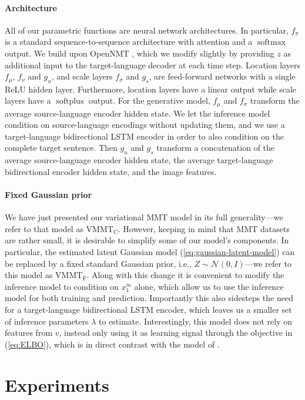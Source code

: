 \documentclass[11pt,a4paper]{article}
\DeclareMathOperator{\softmax}{softmax}
\DeclareMathOperator{\softplus}{softplus}
\newcommand{\cond}{VMMT$_{\text{C}}$\xspace}
\newcommand{\uncond}{VMMT$_{\text{F}}$\xspace}
\begin{document}
\paragraph{Architecture} 
All of our parametric functions are neural network architectures. 
In particular, $f_\pi$ is a standard sequence-to-sequence architecture with attention and a $\softmax$ output. We build upon OpenNMT \citep{opennmt}, which we modify slightly by providing $z$ as additional input to the target-language decoder at each time step.
Location layers $f_\mu$, $f_\nu$ and $g_u$, and scale layers $f_\sigma$ and $g_s$, are feed-forward networks with a single ReLU hidden layer. Furthermore, location layers have a linear output while scale layers have a $\softplus$ output.
For the generative model, $f_\mu$ and $f_\sigma$ transform the average source-language encoder hidden state. We let the inference model condition on source-language encodings without updating them, and we use a target-language bidirectional LSTM encoder in order to also condition on the complete target sentence. Then $g_u$ and $g_s$ transform a concatenation of the average source-language encoder hidden state, the average target-language bidirectional encoder hidden state, and the image features.



\paragraph{Fixed Gaussian prior} We have just presented our variational MMT model in its full generality---we refer to that model as \cond. 
However, keeping in mind that MMT datasets are rather small, it is desirable to simplify some of our model's  components. In particular, the estimated latent Gaussian model (\ref{eq:gaussian-latent-model}) can be replaced by a fixed standard Gaussian prior, i.e., $Z \sim \mathcal N(0, I)$---we refer to this model as \uncond.  Along with this change it is convenient to modify the inference model to condition on $x_1^m$ alone, which allow us to use the inference model for both training and prediction. Importantly this also sidesteps the need for a target-language bidirectional LSTM encoder, which leaves us a smaller set of inference parameters $\lambda$ to estimate. Interestingly, this model does not rely on features from $v$, instead only using it as learning signal through the objective in (\ref{eq:ELBO}), which is in direct contrast with the model of \citet{Toyamaetal2016}.
 \section{Experiments}\label{sec:exp}
\end{document}

